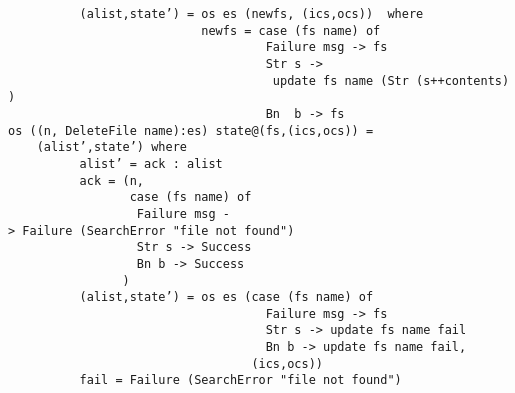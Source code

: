 \mbox{\tt \ \ \ \ \ \ \ \ \ \ (alist,state')\ =\ os\ es\ (newfs,\ (ics,ocs))\ \ where}\\
\mbox{\tt \ \ \ \ \ \ \ \ \ \ \ \ \ \ \ \ \ \ \ \ \ \ \ \ \ \ \ newfs\ =\ case\ (fs\ name)\ of}\\
\mbox{\tt \ \ \ \ \ \ \ \ \ \ \ \ \ \ \ \ \ \ \ \ \ \ \ \ \ \ \ \ \ \ \ \ \ \ \ \ Failure\ msg\ ->\ fs}\\
\mbox{\tt \ \ \ \ \ \ \ \ \ \ \ \ \ \ \ \ \ \ \ \ \ \ \ \ \ \ \ \ \ \ \ \ \ \ \ \ Str\ s\ ->}\\
\mbox{\tt \ \ \ \ \ \ \ \ \ \ \ \ \ \ \ \ \ \ \ \ \ \ \ \ \ \ \ \ \ \ \ \ \ \ \ \ \ update\ fs\ name\ (Str\ (s++contents))}\\
\mbox{\tt \ \ \ \ \ \ \ \ \ \ \ \ \ \ \ \ \ \ \ \ \ \ \ \ \ \ \ \ \ \ \ \ \ \ \ \ Bn\ \ b\ ->\ fs}
\eprogNoSkip
\bprog
\mbox{\tt os\ ((n,\ DeleteFile\ name):es)\ state@(fs,(ics,ocs))\ =}\\
\mbox{\tt \ \ \ \ (alist',state')\ where}\\
\mbox{\tt \ \ \ \ \ \ \ \ \ \ alist'\ =\ ack\ :\ alist}\\
\mbox{\tt \ \ \ \ \ \ \ \ \ \ ack\ =\ (n,}\\
\mbox{\tt \ \ \ \ \ \ \ \ \ \ \ \ \ \ \ \ \ case\ (fs\ name)\ of}\\
\mbox{\tt \ \ \ \ \ \ \ \ \ \ \ \ \ \ \ \ \ \ Failure\ msg\ ->\ Failure\ (SearchError\ "file\ not\ found")}\\
\mbox{\tt \ \ \ \ \ \ \ \ \ \ \ \ \ \ \ \ \ \ Str\ s\ ->\ Success}\\
\mbox{\tt \ \ \ \ \ \ \ \ \ \ \ \ \ \ \ \ \ \ Bn\ b\ ->\ Success}\\
\mbox{\tt \ \ \ \ \ \ \ \ \ \ \ \ \ \ \ \ )}\\
\mbox{\tt \ \ \ \ \ \ \ \ \ \ (alist,state')\ =\ os\ es\ (case\ (fs\ name)\ of}\\
\mbox{\tt \ \ \ \ \ \ \ \ \ \ \ \ \ \ \ \ \ \ \ \ \ \ \ \ \ \ \ \ \ \ \ \ \ \ \ \ Failure\ msg\ ->\ fs}\\
\mbox{\tt \ \ \ \ \ \ \ \ \ \ \ \ \ \ \ \ \ \ \ \ \ \ \ \ \ \ \ \ \ \ \ \ \ \ \ \ Str\ s\ ->\ update\ fs\ name\ fail}\\
\mbox{\tt \ \ \ \ \ \ \ \ \ \ \ \ \ \ \ \ \ \ \ \ \ \ \ \ \ \ \ \ \ \ \ \ \ \ \ \ Bn\ b\ ->\ update\ fs\ name\ fail,}\\
\mbox{\tt \ \ \ \ \ \ \ \ \ \ \ \ \ \ \ \ \ \ \ \ \ \ \ \ \ \ \ \ \ \ \ \ \ \ (ics,ocs))}\\
\mbox{\tt \ \ \ \ \ \ \ \ \ \ fail\ =\ Failure\ (SearchError\ "file\ not\ found")}\\
